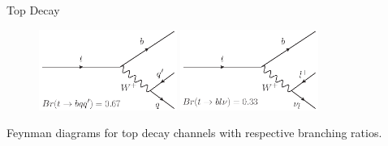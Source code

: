 \begin{frame}{Top Decay}
\vspace{-.2cm}
\begin{figure}[!Hhtbp]
  \begin{center}
    \includegraphics[width=0.4\textwidth]{../figs/Top_H_Decay.png}
    \includegraphics[width=0.4\textwidth]{../figs/Top_L_Decay.png}
  \end{center}
\end{figure}

\vspace{-.2cm}
    \begin{block}{}
      \tiny \centering Feynman diagrams for top decay channels with respective branching ratios.
    \end{block}

\end{frame}

